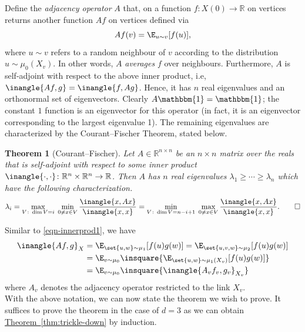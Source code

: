 \documentclass[11pt]{article}
\newcommand{\expref}[2]{\texorpdfstring{\hyperref[#2]{#1~\ref{#2}}}{#1~\ref{#2}}}
\newtheorem{theorem}{Theorem}[section]
\newcommand{\R}{{\mathbb R}}
\begin{document}
Define the \emph{adjacency operator} $A$ that, on a function $f\colon X(0) \rightarrow \R$ on vertices returns another function $Af$ on vertices defined via
\[
  Af(v) = \E_{u\sim v}[f(u)],
\]
where $u\sim v$ refers to a random neighbour of $v$ according to the distribution $u \sim \mu_0(X_v)$.
In other words, $A$ \emph{averages} $f$ over neighbours. Furthermore,
$A$ is self-adjoint with respect to the above inner product, i.e,
$\inangle{Af,g} = \inangle{f,Ag}$. Hence, it has $n$ real eigenvalues
and an orthonormal set of eigenvectors. Clearly
$A\mathbbm{1} = \mathbbm{1}$; the constant $1$ function is an
eigenvector for this operator (in fact, it is an eigenvector
corresponding to the largest eigenvalue 1). The remaining eigenvalues
are characterized by the %
Courant--Fischer Theorem, stated below.  %

%
\begin{theorem}[Courant--Fischer]  \label{thm:cf1}  %
  Let $A\in \R^{n \times n}$ be an $n \times n$ matrix over the reals
  that is self-adjoint with respect to some inner product
  $\inangle{\cdot , \cdot }\colon \R^n \times \R^n \to \R$. Then $A$ has $n$ real
  eigenvalues $\lambda_1 \geq \cdots \geq \lambda_n$ which have the
  following characterization.
  \[
    \lambda_i = \max_{V \colon \dim V = i}\; \min_{0\neq  x \in V}
    \frac{\inangle{x,Ax}}{\inangle{x,x}} =  \min_{V \colon \dim V = n-i+1}\; \max_{ 0\neq x \in V}
    \frac{\inangle{x,Ax}}{\inangle{x,x}}.\qedhere
  \]
%
\end{theorem}       %
    


Similar to \eqref{eqn-innerprod1}, we have
\begin{align}
  \inangle{Af,g}_X & = \E_{\set{u,w} \sim \mu_1} [f(u) g(w)] = \E_{\set{u,v,w} \sim \mu_2} [f(u) g(w)]\nonumber\\
                 & = \E_{v \sim \mu_0}\insquare{\E_{\set{u,w}\sim  \mu_1(X_v)} [f(u) g(w)]}\nonumber\\
                 & = \E_{v \sim \mu_0}\insquare{\inangle{A_v f_v,g_v}_{X_v}}\label{eqn-innerprod2}
\end{align}
where $A_v$ denotes the adjacency operator restricted to the link $X_v$. \\

With the above notation, we can now state the theorem we wish to prove.
It suffices to prove the theorem in the case of $d = 3$ as we can obtain 
\expref{Theorem}{thm:trickle-down} by induction.
\end{document}
